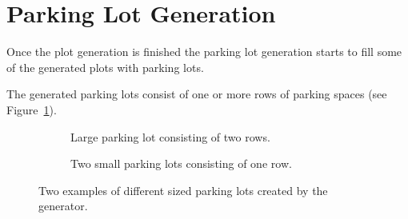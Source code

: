 \section{Parking Lot Generation}

Once the plot generation is finished the parking lot generation starts to fill some of the generated plots with parking lots.

The generated parking lots consist of one or more rows of parking spaces (see Figure~\ref{fig:results_parking_sizebased}).

\begin{figure}[H]
   \centering
   \begin{subfigure}[b]{0.485\textwidth}
     \caption{Large parking lot consisting of two rows.}
   \end{subfigure}
   \quad
   \begin{subfigure}[b]{0.45\textwidth}
     \caption{Two small parking lots consisting of one row.}
   \end{subfigure}
     \caption{Two examples of different sized parking lots created by the generator.}
   \label{fig:results_parking_sizebased}
 \end{figure}

